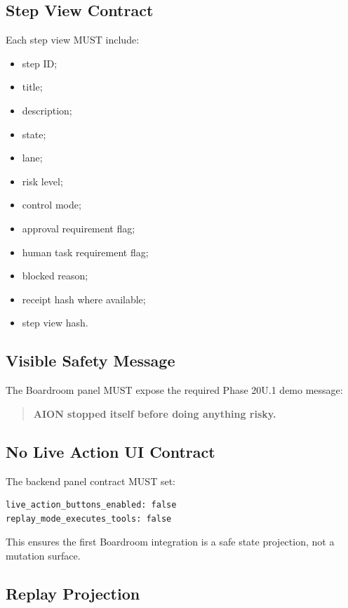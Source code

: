 \subsection{Step View Contract}

Each step view MUST include:

\begin{itemize}
  \item step ID;
  \item title;
  \item description;
  \item state;
  \item lane;
  \item risk level;
  \item control mode;
  \item approval requirement flag;
  \item human task requirement flag;
  \item blocked reason;
  \item receipt hash where available;
  \item step view hash.
\end{itemize}

\subsection{Visible Safety Message}

The Boardroom panel MUST expose the required Phase 20U.1 demo message:

\begin{quote}
\textbf{AION stopped itself before doing anything risky.}
\end{quote}

\subsection{No Live Action UI Contract}

The backend panel contract MUST set:

\begin{verbatim}
live_action_buttons_enabled: false
replay_mode_executes_tools: false
\end{verbatim}

This ensures the first Boardroom integration is a safe state projection, not a mutation surface.

\subsection{Replay Projection}

